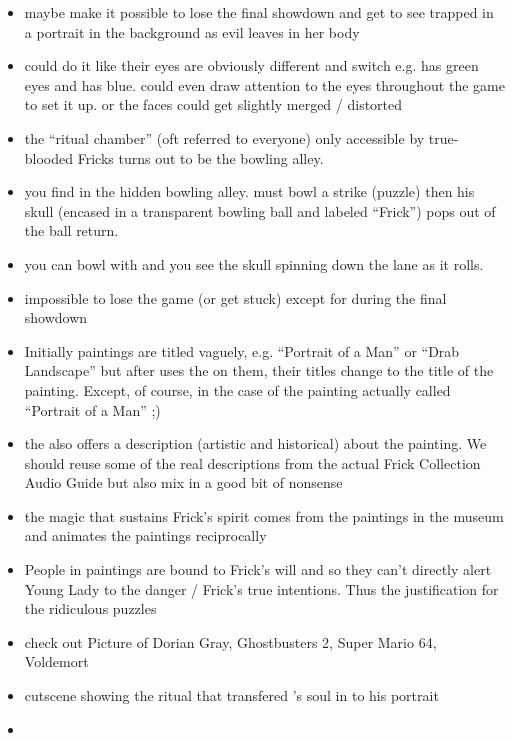 \documentclass{article}
\begin{document}
\begin{itemize}
  \item maybe make it possible to lose the final showdown and get to see \cyl{} trapped in a portrait in the background as evil \cfrick{} leaves in her body
  \item could do it like their eyes are obviously different and switch e.g. \cfrick{} has green eyes and \cyl{} has blue. could even draw attention to the eyes throughout the game to set it up. or the faces could get slightly merged / distorted
  \item the ``ritual chamber'' (oft referred to everyone) only accessible by true-blooded Fricks turns out to be the bowling alley.
  \item you find \ifrickskull{} in the hidden bowling alley. \cyl{} must bowl a strike (puzzle) then his skull (encased in a transparent bowling ball and labeled ``Frick'') pops out of the ball return.
  \item you can bowl with \ifrickskull{} and you see the skull spinning down the lane as it rolls.
  \item impossible to lose the game (or get stuck) except for during the final showdown
  \item Initially paintings are titled vaguely, e.g. ``Portrait of a Man'' or ``Drab Landscape'' but after \cyl{} uses the \iaudioguide{} on them, their titles change to the title of the painting. Except, of course, in the case of the painting actually called ``Portrait of a Man'' ;)
  \item the \iaudioguide also offers a description (artistic and historical) about the painting. We should reuse some of the real descriptions from the actual Frick Collection Audio Guide but also mix in a good bit of nonsense
  \item the magic that sustains Frick’s spirit comes from the paintings in the museum and animates the paintings reciprocally
  \item People in paintings are bound to Frick’s will and so they can’t directly alert Young Lady to the danger / Frick’s true intentions. Thus the justification for the ridiculous puzzles
  \item check out Picture of Dorian Gray, Ghostbusters 2, Super Mario 64, Voldemort
  \item cutscene showing the ritual that transfered \cfrick{}'s soul in to his portrait
  \item \cyl{}
\end{itemize}
\end{document}
